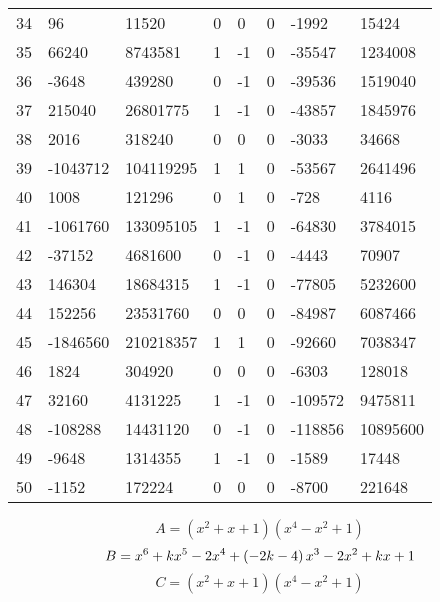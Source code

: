 \documentclass{amsart}
\begin{document}
\begin{longtable}{|l|l|l|lllll|}
34&96&11520&0&0&0&-1992&15424\\
35&66240&8743581&1&-1&0&-35547&1234008\\
36&-3648&439280&0&-1&0&-39536&1519040\\
37&215040&26801775&1&-1&0&-43857&1845976\\
38&2016&318240&0&0&0&-3033&34668\\
39&-1043712&104119295&1&1&0&-53567&2641496\\
40&1008&121296&0&1&0&-728&4116\\
41&-1061760&133095105&1&-1&0&-64830&3784015\\
42&-37152&4681600&0&-1&0&-4443&70907\\
43&146304&18684315&1&-1&0&-77805&5232600\\
44&152256&23531760&0&0&0&-84987&6087466\\
45&-1846560&210218357&1&1&0&-92660&7038347\\
46&1824&304920&0&0&0&-6303&128018\\
47&32160&4131225&1&-1&0&-109572&9475811\\
48&-108288&14431120&0&-1&0&-118856&10895600\\
49&-9648&1314355&1&-1&0&-1589&17448\\
50&-1152&172224&0&0&0&-8700&221648\\
\hline
\end{longtable}
$$A=(x^2
 + x
 + 1)(x^4
 - x^2
 + 1)$$
$$B=x^6
 + k\*x^5
 - 2\*x^4
 + \left(-2\*k
 - 4\right) \*x^3
 - 2\*x^2
 + k\*x
 + 1$$
$$C=(x^2
 + x
 + 1)(x^4
 - x^2
 + 1)$$
\end{document}
